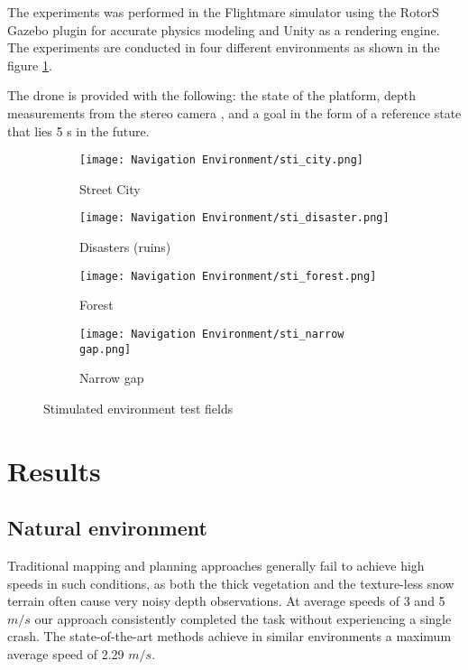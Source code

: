 The experiments was performed in the
Flightmare simulator using the RotorS Gazebo plugin for
accurate physics modeling and Unity as a rendering engine. The
experiments are conducted in four different environments as shown in the figure \ref{fig:stimulated envt}.

The drone is provided with the following: the state of the
platform, depth measurements from the stereo camera \cite{stereoMatching}, and a goal in
the form of a reference state that lies 5 s in the future.

\begin{figure}[!h]
	\centering
	\begin{subfigure}[b]{0.48\textwidth}
		\centering
		\texttt{[image: Navigation Environment/sti\_city.png]}
		\caption{Street City}
	\end{subfigure}
	\hfill
	\begin{subfigure}[b]{0.48\textwidth}
		\centering
		\texttt{[image: Navigation Environment/sti\_disaster.png]}
		\caption{Disasters (ruins)}
	\end{subfigure}
	\hfill	
	\begin{subfigure}[b]{0.48\textwidth}
		\centering
		\texttt{[image: Navigation Environment/sti\_forest.png]}
		\caption{Forest}
	\end{subfigure}
	\hfill
	\begin{subfigure}[b]{0.48\textwidth}
		\centering
		\texttt{[image: Navigation Environment/sti\_narrow gap.png]}
		\caption{Narrow gap}
	\end{subfigure}
	
	\caption{Stimulated environment test fields}
	\label{fig:stimulated envt}
\end{figure}


\section{Results}

\subsection{Natural environment}
Traditional mapping and planning approaches generally fail to achieve high speeds in such conditions, as
both the thick vegetation and the texture-less snow terrain often cause
very noisy depth observations. At average speeds of 3 and 5 $m/s$ our approach consistently completed the task without experiencing a single crash. 
The state-of-the-art methods achieve in similar environments a maximum average
speed of 2.29 $m/s$.

